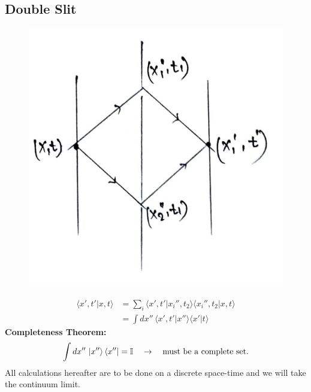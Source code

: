\documentclass[14pt]{article} %
\begin{document}
\subsection{Double Slit}
\vspace{-1.5cm}
\begin{figure}[H]
    \centering
    \includegraphics[width=0.5\linewidth]{figures/C10_4.jpeg}
    \caption*{}
\end{figure}
\vspace{-2cm}
\begin{align*}
\langle x', t' | x, t \rangle &= \sum_i \langle x', t' | x_i'', t_2 \rangle \langle x_i'', t_2 | x, t \rangle
 \\
&= \int dx'' \, \langle x', t' | x'' \rangle \langle x' | t \rangle
\end{align*}
\textbf{Completeness Theorem:}
\[
\int dx'' \, \ket{x''} \bra{x''} = \mathbb{I} \quad \to \quad \text{must be a complete set.}
\]
All calculations hereafter are to be done on a discrete space-time and we will take the continuum limit.\\
\end{document}
